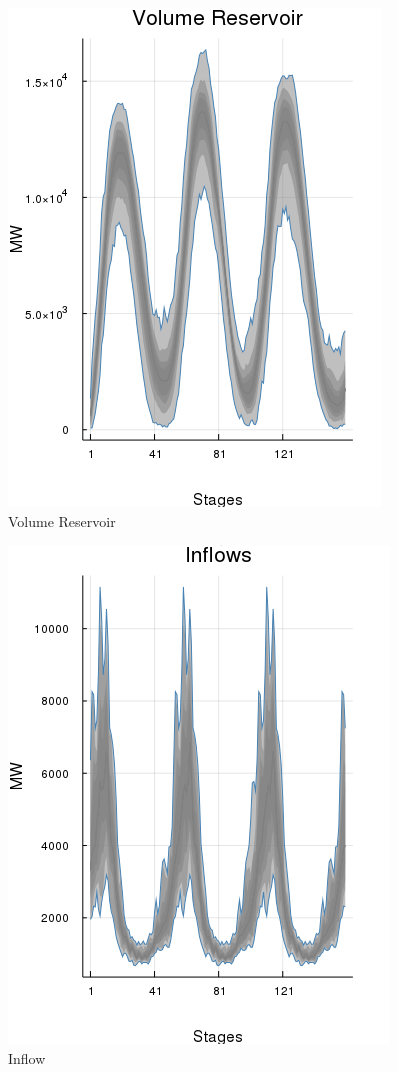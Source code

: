 \documentclass{juliacon}
\begin{document}
\begin{figure}[H]
\centerline{\includegraphics[width=0.55\linewidth]{fig/plot_agg_result_vol.png}}
\caption{Volume Reservoir}
\label{fig:plot_agg_result_vol}
\end{figure}

\begin{figure}[H]
\centerline{\includegraphics[width=0.55\linewidth]{fig/plot_agg_result_inflow.png}}
\caption{Inflow}
\label{fig:plot_agg_result_inflow}
\end{figure}


\end{document}
